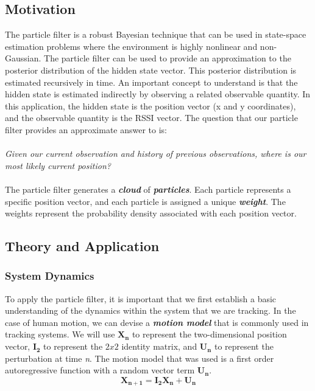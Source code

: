 \documentclass[12pt, a4paper]{article}
\begin{document}
		\subsection{Motivation}
			The particle filter is a robust Bayesian technique that can be used in state-space estimation problems where the environment is highly nonlinear and non-Gaussian. The particle filter can be used to provide an approximation to the posterior distribution of the hidden state vector. This posterior distribution is estimated recursively in time. An important concept to understand is that the hidden state is estimated indirectly by observing a related observable quantity. In this application, the hidden state is the position vector (x and y coordinates), and the observable quantity is the RSSI vector. The question that our particle filter provides an approximate answer to is: \\ \\ \textit{Given our current observation and history of previous observations, where is our most likely current position?}
\\ \\ The particle filter generates a \textbf{\textit{cloud}} of \textbf{\textit{particles}}. Each particle represents a specific position vector, and each particle is assigned a unique \textbf{\textit{weight}}. The weights represent the probability density associated with each position vector. 

		\subsection{Theory and Application}
			\subsubsection{System Dynamics}
				To apply the particle filter, it is important that we first establish a basic understanding of the dynamics within the system that we are tracking. In the case of human motion, we can devise a \textbf{\textit{motion model}} that is commonly used in tracking systems. We will use $\mathbf{X_{n}}$ to represent the two-dimensional position vector, $\mathbf{I_{2}}$ to represent the $2 x 2$ identity matrix, and $\mathbf{U_{n}}$ to represent the perturbation at time \textit{n}. The motion model that was used is a first order autoregressive function with a random vector term $ \mathbf{U_{n}} $. 
				\begin{equation}
					\mathbf{X_{n+1}} = \mathbf{I_{2}} \mathbf{X_{n}} + \mathbf{U_{n}}
				\end{equation}
\end{document}
